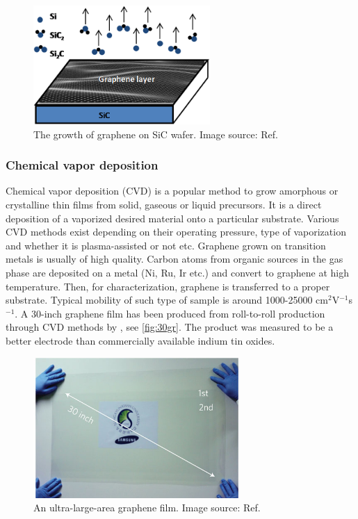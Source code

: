 \begin{figure}[htbp!] 
\centering  
\includegraphics[width=0.6\textwidth]{gr-sic.png}
\caption[The growth of graphene on SiC wafer]{The growth of graphene on SiC wafer. Image source: Ref. \cite{Mishra2016}}  
\label{fig:sic}
\end{figure} 

\subsubsection{Chemical vapor deposition}

Chemical vapor deposition (CVD) is a popular method to grow amorphous or crystalline thin films from solid, gaseous or liquid precursors. It is a direct deposition of a vaporized desired material onto a particular substrate. Various CVD methods exist depending on their operating pressure, type of vaporization and whether it is plasma-assisted or not etc. Graphene grown on transition metals is usually of high quality. Carbon atoms from organic sources in the gas phase are deposited on a metal (Ni, Ru, Ir etc.) and convert to graphene at high temperature. Then, for characterization, graphene is transferred to a proper substrate. Typical mobility of such type of sample is around 1000-25000 cm$^2$V$^{-1}$s$^{-1}$\cite{Petrone2012}. A 30-inch graphene film has been produced from roll-to-roll production through CVD methods by \citet{Bae2010}, see \autoref{fig:30gr}. The product was measured to be a better electrode than commercially available indium tin oxides.

\begin{figure}[htbp!] 
\centering  
\includegraphics[width=0.7\textwidth]{30-inches-gr.jpg}
\caption[An ultra-large-area graphene film]{An ultra-large-area graphene film. Image source: Ref. \cite{Bae2010}}  
\label{fig:30gr}
\end{figure} 

